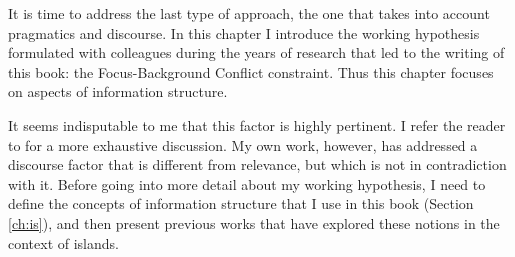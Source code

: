\label{ch:discourse}

It is time to address the last type of approach, the one that takes into account pragmatics and discourse. In this chapter I introduce the working hypothesis formulated with colleagues during the years of research that led to the writing of this book: the Focus-Background Conflict constraint. Thus this chapter focuses on aspects of information structure.



It seems indisputable to me that this factor is highly pertinent. I refer the reader to \citet{Chaves.2020.UDC} for a more exhaustive discussion. My own work, however, has addressed a discourse factor that is different from relevance, but which is not in contradiction with it. Before going into more detail about my working hypothesis, I need to define the concepts of information structure that I use in this book (Section \ref{ch:is}), and then present previous works that have explored these notions in the context of islands.



